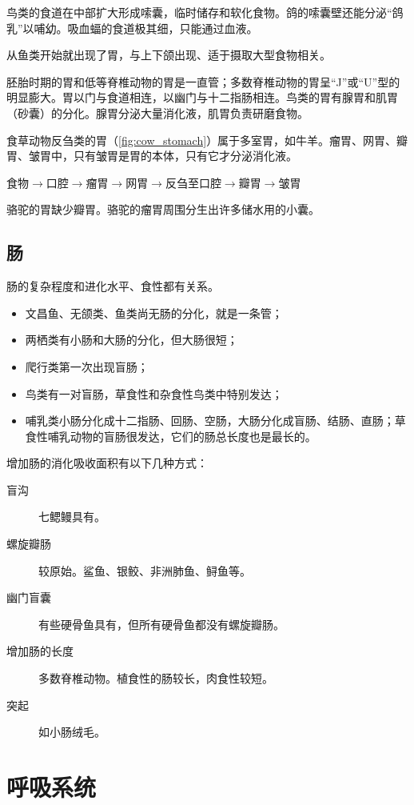 鸟类的食道在中部扩大形成嗦囊，临时储存和软化食物。鸽的嗦囊壁还能分泌“鸽乳”以哺幼。吸血蝠的食道极其细，只能通过血液。

从鱼类开始就出现了胃，与上下颌出现、适于摄取大型食物相关。

胚胎时期的胃和低等脊椎动物的胃是一直管；多数脊椎动物的胃呈“J”或“U”型的明显膨大。胃以门与食道相连，以幽门与十二指肠相连。鸟类的胃有腺胃和肌胃（砂囊）的分化。腺胃分泌大量消化液，肌胃负责研磨食物。

食草动物反刍类的胃（\autoref{fig:cow_stomach}）属于多室胃，如牛羊。瘤胃、网胃、瓣胃、皱胃中，只有皱胃是胃的本体，只有它才分泌消化液。

食物$\longrightarrow$口腔$\longrightarrow$瘤胃$\longrightarrow$网胃$\longrightarrow$反刍至口腔$\longrightarrow$瓣胃$\longrightarrow$皱胃

骆驼的胃缺少瓣胃。骆驼的瘤胃周围分生出许多储水用的小囊。

\subsection{肠}

肠的复杂程度和进化水平、食性都有关系。

\begin{itemize}
	\item 文昌鱼、无颌类、鱼类尚无肠的分化，就是一条管；
	\item 两栖类有小肠和大肠的分化，但大肠很短；
	\item 爬行类第一次出现盲肠；
	\item 鸟类有一对盲肠，草食性和杂食性鸟类中特别发达；
	\item 哺乳类小肠分化成十二指肠、回肠、空肠，大肠分化成盲肠、结肠、直肠；草食性哺乳动物的盲肠很发达，它们的肠总长度也是最长的。
\end{itemize}

增加肠的消化吸收面积有以下几种方式：

\begin{description}
	\item[盲沟] 七鳃鳗具有。
	\item[螺旋瓣肠] 较原始。鲨鱼、银鲛、非洲肺鱼、鲟鱼等。
	\item[幽门盲囊] 有些硬骨鱼具有，但所有硬骨鱼都没有螺旋瓣肠。
	\item[增加肠的长度] 多数脊椎动物。植食性的肠较长，肉食性较短。
	\item[突起] 如小肠绒毛。
\end{description}

\section{呼吸系统}

